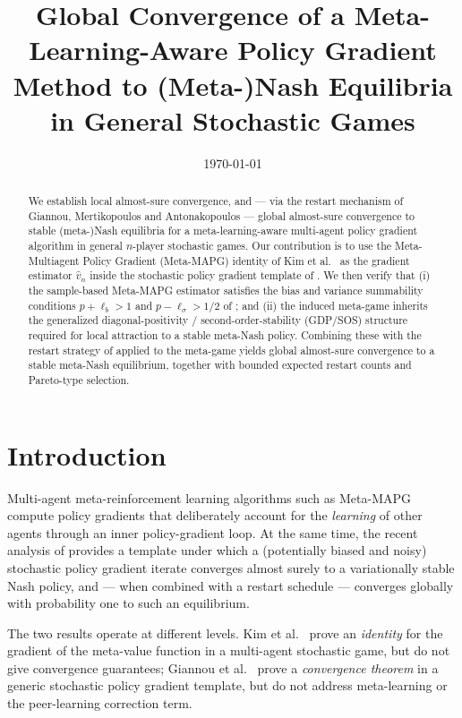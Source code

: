 \documentclass[11pt]{article}
\title{Global Convergence of a Meta-Learning-Aware Policy Gradient Method to (Meta-)Nash Equilibria in General Stochastic Games}
\author{}
\date{\today}
\theoremstyle{definition}
\begin{document}
\maketitle

\begin{abstract}
We establish local almost-sure convergence, and --- via the restart mechanism of Giannou, Mertikopoulos and Antonakopoulos \cite{Giannou2022} --- global almost-sure convergence to stable (meta-)Nash equilibria for a meta-learning-aware multi-agent policy gradient algorithm in general $n$-player stochastic games. Our contribution is to use the Meta-Multiagent Policy Gradient (Meta-MAPG) identity of Kim et al.\ \cite{Kim2021} as the gradient estimator $\hat v_n$ inside the stochastic policy gradient template of \cite{Giannou2022}. We then verify that (i) the sample-based Meta-MAPG estimator satisfies the bias and variance summability conditions $p+\ell_b>1$ and $p-\ell_\sigma>1/2$ of \cite[Theorem~1]{Giannou2022}; and (ii) the induced meta-game inherits the generalized diagonal-positivity / second-order-stability (GDP/SOS) structure required for local attraction to a stable meta-Nash policy. Combining these with the restart strategy of \cite[§4]{Giannou2022} applied to the meta-game yields global almost-sure convergence to a stable meta-Nash equilibrium, together with bounded expected restart counts and Pareto-type selection.
\end{abstract}

\section{Introduction}

Multi-agent meta-reinforcement learning algorithms such as Meta-MAPG \cite{Kim2021} compute policy gradients that deliberately account for the \emph{learning} of other agents through an inner policy-gradient loop. At the same time, the recent analysis of \cite{Giannou2022} provides a template under which a (potentially biased and noisy) stochastic policy gradient iterate converges almost surely to a variationally stable Nash policy, and --- when combined with a restart schedule --- converges globally with probability one to such an equilibrium.

The two results operate at different levels. Kim et al.\ \cite{Kim2021} prove an \emph{identity} for the gradient of the meta-value function in a multi-agent stochastic game, but do not give convergence guarantees; Giannou et al.\ \cite{Giannou2022} prove a \emph{convergence theorem} in a generic stochastic policy gradient template, but do not address meta-learning or the peer-learning correction term.
\end{document}
